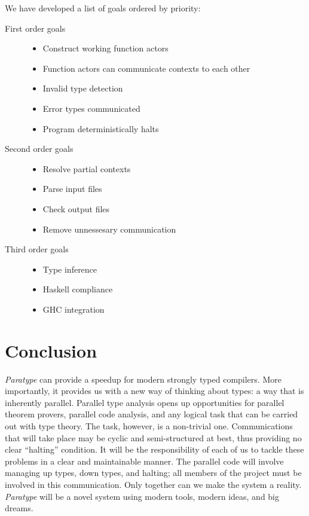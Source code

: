 \documentclass{acm_proc_article-sp}
\begin{document}
We have developed a list of goals ordered by priority:
\begin{description}
	\item[First order goals]
          \hfill
          \begin{itemize}
            \item Construct working function actors 
            \item Function actors can communicate contexts to each other
            \item Invalid type detection
            \item Error types communicated
            \item Program deterministically halts
          \end{itemize}

	\item[Second order goals]
          \hfill
          \begin{itemize}
            \item Resolve partial contexts
            \item Parse input files
            \item Check output files
            \item Remove unnessesary communication
          \end{itemize}

	\item[Third order goals]
          \hfill
          \begin{itemize}
            \item Type inference
            \item Haskell compliance
            \item GHC integration
          \end{itemize}
\end{description}

\section{Conclusion}

\emph{Paratype} can provide a speedup for modern strongly typed compilers. More
importantly, it provides us with a new way of thinking about types: a way that
is inherently parallel. Parallel type analysis opens up opportunities for
parallel theorem provers, parallel code analysis, and any logical task that can
be carried out with type theory. The task, however, is a non-trivial one.
Communications that will take place may be cyclic and semi-structured at best,
thus providing no clear ``halting'' condition. It will be the responsibility
of each of us to tackle these problems in a clear and maintainable
manner. The parallel code will involve managing up types, down types,
and halting; all members of the project must be involved in this
communication. Only together can we make the system a reality. 
\emph{Paratype} will be a novel system using modern
tools, modern ideas, and big dreams. 
\end{document}
